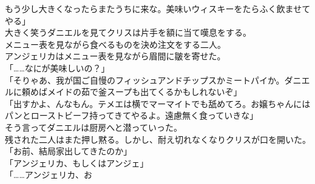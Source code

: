 \documentclass[b5j,10pt,openany]{jsbook}
\begin{document}
もう少し大きくなったらまたうちに来な。美味いウィスキーをたらふく飲ませてやる」\\大きく笑うダニエルを見てクリスは片手を額に当て嘆息をする。\\メニュー表を見ながら食べるものを決め注文をする二人。\\アンジェリカはメニュー表を見ながら眉間に皺を寄せた。\\「\ldots{}\ldots{}なにが美味しいの？」\\「そりゃあ、我が国ご自慢のフィッシュアンドチップスかミートパイか。ダニエルに頼めばメイドの茹で釜スープも出てくるかもしれないぞ」\\「出すかよ、んなもん。テメエは横でマーマイトでも舐めてろ。お嬢ちゃんにはパンとローストビーフ持ってきてやるよ。遠慮無く食っていきな」\\そう言ってダニエルは厨房へと潜っていった。\\残された二人はまた押し黙る。しかし、耐え切れなくなりクリスが口を開いた。\\「お前、結局家出してきたのか」\\「アンジェリカ、もしくはアンジェ」\\「\ldots{}\ldots{}アンジェリカ、お
\end{document}
